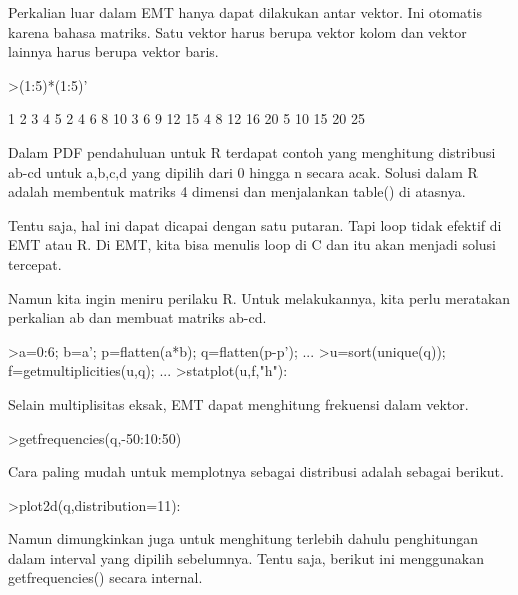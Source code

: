 \documentclass[a4paper,10pt]{article}
\begin{document}
\begin{eulernotebook}
\begin{eulercomment}
\begin{eulercomment}
\begin{eulercomment}
\begin{eulercomment}
\begin{eulercomment}
\begin{eulercomment}
\begin{eulercomment}
Perkalian luar dalam EMT hanya dapat dilakukan antar vektor. Ini
otomatis karena bahasa matriks. Satu vektor harus berupa vektor kolom
dan vektor lainnya harus berupa vektor baris.
\end{eulercomment}
\begin{eulerprompt}
>(1:5)*(1:5)'
\end{eulerprompt}
\begin{euleroutput}
          1         2         3         4         5 
          2         4         6         8        10 
          3         6         9        12        15 
          4         8        12        16        20 
          5        10        15        20        25 
\end{euleroutput}
\begin{eulercomment}
Dalam PDF pendahuluan untuk R terdapat contoh yang menghitung
distribusi ab-cd untuk a,b,c,d yang dipilih dari 0 hingga n secara
acak. Solusi dalam R adalah membentuk matriks 4 dimensi dan
menjalankan table() di atasnya.

Tentu saja, hal ini dapat dicapai dengan satu putaran. Tapi loop tidak
efektif di EMT atau R. Di EMT, kita bisa menulis loop di C dan itu
akan menjadi solusi tercepat.

Namun kita ingin meniru perilaku R. Untuk melakukannya, kita perlu
meratakan perkalian ab dan membuat matriks ab-cd.
\end{eulercomment}
\begin{eulerprompt}
>a=0:6; b=a'; p=flatten(a*b); q=flatten(p-p'); ...
>u=sort(unique(q)); f=getmultiplicities(u,q); ...
>statplot(u,f,"h"):
\end{eulerprompt}
\begin{eulercomment}
Selain multiplisitas eksak, EMT dapat menghitung frekuensi dalam
vektor.
\end{eulercomment}
\begin{eulerprompt}
>getfrequencies(q,-50:10:50)
\end{eulerprompt}
\begin{euleroutput}
  [0,  23,  132,  316,  602,  801,  333,  141,  53,  0]
\end{euleroutput}
\begin{eulercomment}
Cara paling mudah untuk memplotnya sebagai distribusi adalah sebagai
berikut.
\end{eulercomment}
\begin{eulerprompt}
>plot2d(q,distribution=11):
\end{eulerprompt}
\begin{eulercomment}
Namun dimungkinkan juga untuk menghitung terlebih dahulu penghitungan
dalam interval yang dipilih sebelumnya. Tentu saja, berikut ini
menggunakan getfrequencies() secara internal.


\end{eulercomment}
\end{eulercomment}
\end{eulercomment}
\end{eulercomment}
\end{eulercomment}
\end{eulercomment}
\end{eulercomment}
\end{eulernotebook}
\end{document}
